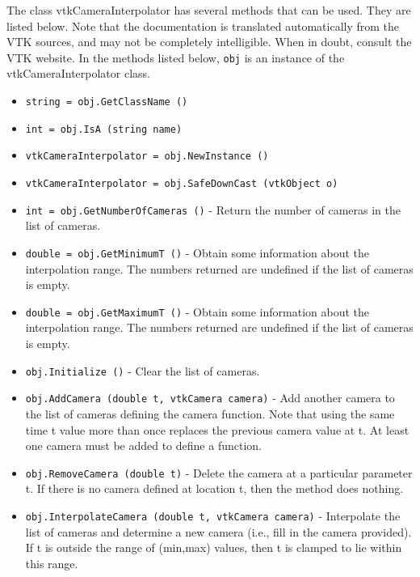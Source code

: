 The class vtkCameraInterpolator has several methods that can be used.
  They are listed below.
Note that the documentation is translated automatically from the VTK sources,
and may not be completely intelligible.  When in doubt, consult the VTK website.
In the methods listed below, \verb|obj| is an instance of the vtkCameraInterpolator class.
\begin{itemize}
\item  \verb|string = obj.GetClassName ()|

\item  \verb|int = obj.IsA (string name)|

\item  \verb|vtkCameraInterpolator = obj.NewInstance ()|

\item  \verb|vtkCameraInterpolator = obj.SafeDownCast (vtkObject o)|

\item  \verb|int = obj.GetNumberOfCameras ()| -  Return the number of cameras in the list of cameras.

\item  \verb|double = obj.GetMinimumT ()| -  Obtain some information about the interpolation range. The numbers
 returned are undefined if the list of cameras is empty.

\item  \verb|double = obj.GetMaximumT ()| -  Obtain some information about the interpolation range. The numbers
 returned are undefined if the list of cameras is empty.

\item  \verb|obj.Initialize ()| -  Clear the list of cameras.

\item  \verb|obj.AddCamera (double t, vtkCamera camera)| -  Add another camera to the list of cameras defining
 the camera function. Note that using the same time t value
 more than once replaces the previous camera value at t.
 At least one camera must be added to define a function.

\item  \verb|obj.RemoveCamera (double t)| -  Delete the camera at a particular parameter t. If there is no
 camera defined at location t, then the method does nothing.

\item  \verb|obj.InterpolateCamera (double t, vtkCamera camera)| -  Interpolate the list of cameras and determine a new camera (i.e.,
 fill in the camera provided). If t is outside the range of
 (min,max) values, then t is clamped to lie within this range.


\end{itemize}

